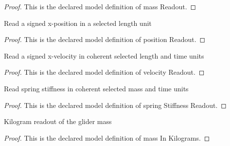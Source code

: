 \begin{proof}
  This is the declared model definition of mass Readout.
\end{proof}
\begin{definition}
  \label{def:physics:phyx-mini-0813:phyxminiproblems-problemphyxmini0813-positionreadout}
  Read a signed x-position in a selected length unit
\end{definition}
\begin{proof}
  This is the declared model definition of position Readout.
\end{proof}
\begin{definition}
  \label{def:physics:phyx-mini-0813:phyxminiproblems-problemphyxmini0813-velocityreadout}
  Read a signed x-velocity in coherent selected length and time units
\end{definition}
\begin{proof}
  This is the declared model definition of velocity Readout.
\end{proof}
\begin{definition}
  \label{def:physics:phyx-mini-0813:phyxminiproblems-problemphyxmini0813-springstiffnessreadout}
  Read spring stiffness in coherent selected mass and time units
\end{definition}
\begin{proof}
  This is the declared model definition of spring Stiffness Readout.
\end{proof}
\begin{definition}
  \label{def:physics:phyx-mini-0813:phyxminiproblems-problemphyxmini0813-massinkilograms}
  Kilogram readout of the glider mass
\end{definition}
\begin{proof}
  This is the declared model definition of mass In Kilograms.
\end{proof}
